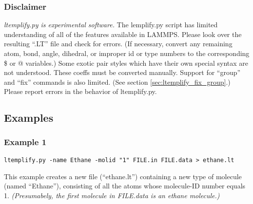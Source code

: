 \documentclass[11pt]{article}
\begin{document}



\subsubsection*{Disclaimer}

\textit{ltemplify.py is experimental software.}
The lemplify.py script has limited understanding of all of the features
available in LAMMPS.
Please look over the resulting ``.LT'' file and check for errors.
(If necessary, convert any remaining
atom, bond, angle, dihedral, or improper id or type numbers to the
corresponding \$ or @ variables.)
Some exotic pair styles which have their own special syntax 
are not understood.
These coeffs must be converted manually.
Support for ``group'' and ``fix'' commands is also limited.
(See section \ref{sec:ltemplify_fix_group}.)
Please report errors in the behavior of ltemplify.py.








\subsection{Examples}
\label{sec:ltemplify_examples}


\subsubsection*{Example 1}

\begin{verbatim}
ltemplify.py -name Ethane -molid "1" FILE.in FILE.data > ethane.lt
\end{verbatim}

This example creates a new file (``ethane.lt'')
containing a new type of molecule (named ``Ethane''),
consisting of all the atoms whose molecule-ID number equals 1.
\textit{(Presumabely, the first molecule in FILE.data is an ethane molecule.)}
\end{document}
